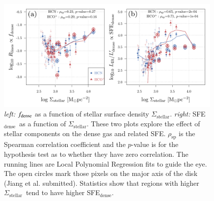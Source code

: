 \documentclass[legal,11pt]{article}
\newcommand{\sigmastellar}{$\Sigma_\text{stellar}$}
\newcommand{\sfedense}{SFE$_\text{dense}$}
\begin{document}
\begin{figure}
\centering
\includegraphics[width=0.99\textwidth]{Jiang_SFE_star.pdf}
\caption{
{\it left:} $f_{\rm dense}$ as a function of stellar surface density \sigmastellar. {\it right:} \sfedense\ as a function of \sigmastellar. These 
two plots explore the effect of stellar components on the dense gas and related
SFE. 
$\rho_\text{sp}$ is the Spearman correlation coefficient and the $p$-value is for the hypothesis test as to whether they have zero correlation. 
The running lines are Local Polynomial Regression fits to guide the eye. The open circles mark those pixels on the major axis of the disk (Jiang et al. submitted). Statistics show that regions with higher \sigmastellar\ tend to have
higher \sfedense.
%
} \label{fig:jiang_relation}

\end{figure}

%
%
%
\end{document}

